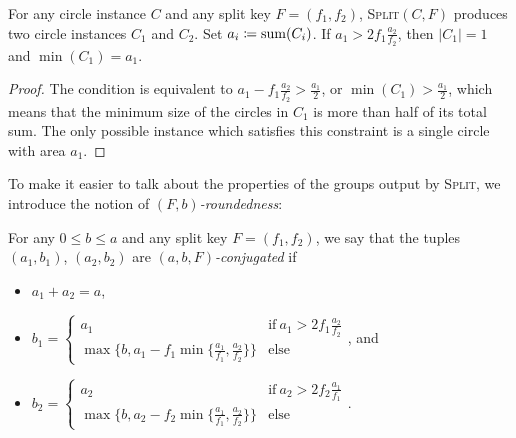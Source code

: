 \documentclass[a4paper,style=print,bibliography=totoc,nexus,lnum,extramargin]{tubsbook}
\begin{document}
\begin{lemma}
    For any circle instance $C$ and any split key $F = (f_1, f_2)$, \textsc{Split}$(C,F)$ produces two circle instances $C_1$ and $C_2$. Set $a_i \coloneqq \operatorname{sum}(C_i)$.
    If $a_1 > 2 f_1 \frac{a_2}{f_2}$, then $|C_1| = 1$ and $\min(C_1) = a_1$.
\end{lemma}

\begin{proof}
    The condition is equivalent to $a_1 - f_1 \frac{a_2}{f_2} > \frac{a_1}{2}$, or $\min(C_1) > \frac{a_1}{2}$, which means that the minimum size of the circles in $C_1$ is more than half of its total sum. The only possible instance which satisfies this constraint is a single circle with area $a_1$.
\end{proof}

To make it easier to talk about the properties of the groups output by \textsc{Split}, we introduce the notion of \emph{$(F,b)$-roundedness}:


\begin{definition}\label{def:rounded}
    For any $0 \le b \le a$ and any split key $F = (f_1, f_2)$, we say that the tuples $(a_1, b_1)$, $(a_2, b_2)$ are \emph{$(a,b,F)$-conjugated} if

    \begin{itemize}
        \item $a_1 + a_2 = a$,
        \item $b_1 = \begin{cases}
                a_1 & \text{if}\ a_1 > 2 f_1 \frac{a_2}{f_2}\\
                \max\{b,a_1 - f_1 \min\{\frac{a_1}{f_1}, \frac{a_2}{f_2}\}\} & \text{else}
            \end{cases}$, and
        \item $b_2 = \begin{cases}
                a_2 & \text{if}\ a_2 > 2 f_2 \frac{a_1}{f_1}\\
                \max\{b,a_2 - f_2 \min\{\frac{a_1}{f_1}, \frac{a_2}{f_2}\}\} & \text{else}
            \end{cases}$.
    \end{itemize}
\end{definition}
\end{document}
